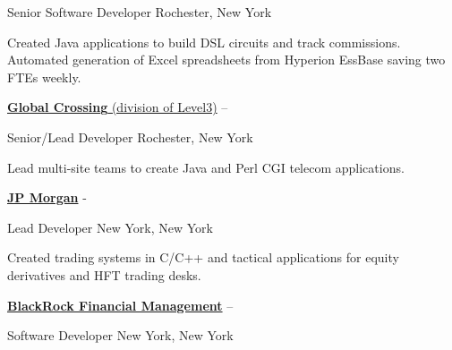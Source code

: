 \documentclass[letterpaper,MMMMyyyy,nonstopmode]{simpleresumecv}
\newcommand{\comment}[1]{\ignorespaces} %
\begin{document}
\begin{Body}
Senior Software Developer
\hfill
Rochester, New York

\begin{Detail}
\Item
Created Java applications to build DSL circuits and track commissions\comment{; CruiseControl used for Continuous Integration}. 
Automated generation of \comment{20} Excel spreadsheets from Hyperion EssBase saving two FTEs weekly.

\end{Detail}

\BigGap
\Entry
\href{http://www.globalcrossing.com/}
{\textbf{Global  Crossing} (division of Level3)}
\hfill 
 -- 

Senior/Lead Developer
\hfill
Rochester, New York

\begin{Detail}
\Item
Lead multi-site teams to create Java and Perl CGI telecom applications.

\end{Detail}

\BigGap
\Entry
\href{http://www.jpmorganchase.com/}
{\textbf{JP Morgan}}
\hfill 
 - 

Lead Developer
\hfill
New York, New York

\begin{Detail}
\Item
Created trading systems in C/C++ and tactical applications for equity derivatives and HFT trading desks.

\end{Detail}

\BigGap
\Entry
\href{http://www.blackrock.com/}
{\textbf{BlackRock Financial Management}}
\hfill 
 --  

Software Developer
\hfill
New York, New York


\end{Body}
\end{document}
